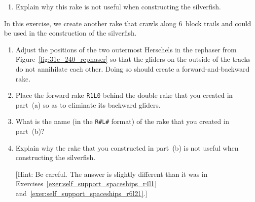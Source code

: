 \begin{multicols}{2}
\begin{problem}
\begin{enumerate}[label=\bf\color{ocre}(\alph*)]
		\item Explain why this rake is not useful when constructing the silverfish.
	\end{enumerate}
\end{problem}


\mfilbreak


\begin{problem}\label{exer:self_support_spaceships_r2l16}
	In this exercise, we create another rake that crawls along $6$~block trails and could be used in the construction of the silverfish.
	
	\begin{enumerate}[label=\bf\color{ocre}(\alph*)]
		\item Adjust the positions of the two outermost Herschels in the rephaser from Figure~\ref{fig:31c_240_rephaser} so that the gliders on the outside of the tracks do not annihilate each other. Doing so should create a forward-and-backward rake.
		
		\item Place the forward rake \texttt{R1L0} behind the double rake that you created in part~(a) so as to eliminate its backward gliders.
		
		\item What is the name (in the \texttt{R\#L\#} format) of the rake that you created in part~(b)?
		
		\item Explain why the rake that you constructed in part~(b) is not useful when constructing the silverfish.
		
		[Hint: Be careful. The answer is slightly different than it was in Exercises~\ref{exer:self_support_spaceships_r4l1} and~\ref{exer:self_support_spaceships_r6l21}.]
	\end{enumerate}
\end{problem}

\end{multicols}
\normalsize\vspace*{0.01cm}
